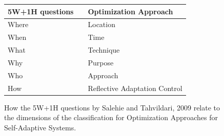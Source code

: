 \begin{figure}[h!]
    \centering
    \begin{tabular}{|lcl|}
        \hline
        5W+1H questions & & Optimization Approach \\
        \hline
        Where & & Location \\
        \hline
        When & & Time \\
        \hline
        What & & Technique \\
        \hline
        Why & & Purpose \\
        \hline
        Who & & Approach \\
        \hline
        How & & Reflective Adaptation Control \\
        \hline
    \end{tabular}
    \caption{How the 5W+1H questions by Salehie and Tahvildari, 2009 \cite*{LandscapeAndResearchChallenges}
    relate to the dimensions of the classification for Optimization Approaches for Self-Adaptive Systems.}
    \label{fig:5W1HProposal}
\end{figure}